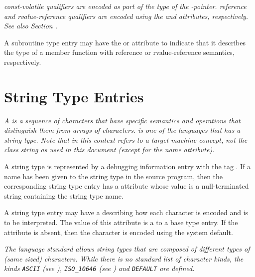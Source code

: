 \textit{ const-volatile qualifiers are encoded as 
part of the type of the
-pointer.
\bb 
{} 
\eb
reference and rvalue-reference qualifiers are encoded using
the \DWATreference{} and \DWATrvaluereference{} attributes, respectively. 
See also Section .}

A subroutine type entry may have the \DWATreference{} or
\DWATrvaluereference{} attribute to indicate that it describes the
type of a member function with reference or rvalue-reference 
semantics, respectively.

\section{String Type Entries}
\label{chap:stringtypeentries}

\textit{A  is a sequence of characters that have specific
semantics and operations that distinguish them from arrays of
characters. 
 is one of the languages that has a string
type. Note that  in this context refers to a target
machine concept, not the class string as used in this document
(except for the name attribute).}

A string type is represented by a debugging information entry
with the tag \DWTAGstringtypeTARG. 
If a name has been given to
the string type in the source program, then the corresponding
string type entry has a 
\DWATname{} attribute
whose value is a null-terminated string containing the string type name.
\bbeb

A string type entry may have a \DWATtypeDEFN{} 
describing how each character is encoded and is to be interpreted.  
The value of this attribute is a \CLASSreference{} to a 
\DWTAGbasetype{} base type entry.  If the attribute is absent, 
then the character is encoded using the system default.

\textit{The 
 language standard allows string 
types that are composed of different types of (same sized) characters. 
While there is no standard list of character kinds, the kinds
\texttt{ASCII} (see \DWATEASCII), 
\texttt{ISO\_10646}
(see \DWATEUCS) and 
\texttt{DEFAULT}
are defined.}

